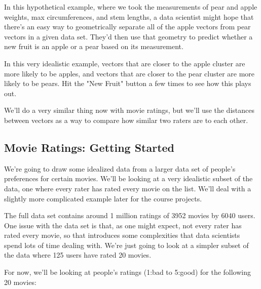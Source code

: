 \documentclass{ximera}
\begin{document}
  \begin{example}
    In this hypothetical example, where we took the measurements of pear and apple weights, max circumferences, and stem lengths, a data scientist might hope that there's an easy way to geometrically separate all of the apple vectors from pear vectors in a given data set. They'd then use that geometry to predict whether a new fruit is an apple or a pear based on its measurement. 


    \begin{center}
    \end{center}

    In this very idealistic example, vectors that are closer to the apple cluster are more likely to be apples, and vectors that are closer to the pear cluster are more likely to be pears. Hit the "New Fruit" button a few times to see how this plays out.

    We'll do a very similar thing now with movie ratings, but we'll use the distances between vectors as a way to compare how similar two raters are to each other.

    
\end{example}

  \subsection{Movie Ratings: Getting Started}
  We're going to draw some idealized data from a larger data set of people's preferences for certain movies. We'll be looking at a very idealistic subset of the data, one where every rater has rated every movie on the list. We'll deal with a slightly more complicated example later for the course projects. 

  The full data set contains around 1 million ratings of 3952 movies by 6040 users. One issue with the data set is that, as one might expect, not every rater has rated every movie, so that introduces some complexities that data scientists spend lots of time dealing with. We're just going to look at a simpler subset of the data where 125 users have rated 20 movies.

  For now, we'll be looking at people's ratings (1:bad to 5:good) for the following 20 movies:
\end{document}
